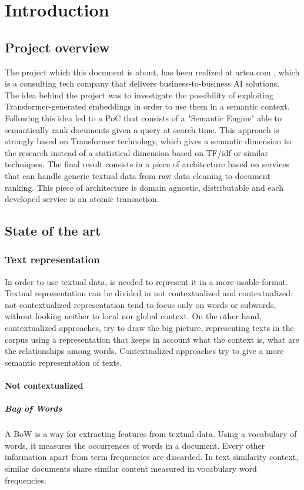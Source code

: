 \documentclass[\main/main.tex]{subfiles}
\begin{document}
\chapter{Introduction}
\section{Project overview}
The project which this document is about, has been realized at artea.com \cite{artea}, which is a consulting tech company that delivers business-to-business AI solutions. \\
The idea behind the project was to investigate the possibility of exploiting Transformer-generated embeddings in order to use them in a semantic context. Following this idea led to a PoC that consists of a "Semantic Engine" able to semantically rank documents given a query at search time. This approach is strongly based on Transformer technology, which gives a semantic dimension to the research instead of a statistical dimension based on TF/idf or similar techniques.
The final result consists in a piece of architecture based on services that can handle generic textual data from raw data cleaning to document ranking. This piece of architecture is domain agnostic, distributable and each developed service is an atomic transaction.
\section{State of the art}
\subsection{Text representation}
In order to use textual data, is needed to represent it in a more usable format. Textual representation can be divided in not contextualized and contextualized: not contextualized representation tend to focus only on words or subwords, without looking neither to local nor global context. On the other hand, contextualized approaches, try to draw the big picture, representing texts in the corpus using a representation that keeps in account what the context is, what are the relationships among words. Contextualized approaches try to give a more semantic representation of texts.
\subsubsection{Not contextualized}
\paragraph{Bag of Words}
A BoW is a way for extracting features from textual data. Using a vocabulary of words, it measures the occurrences of words in a document. Every other information apart from term frequencies are discarded. In text similarity context, similar documents share similar content measured in vocabulary word frequencies.
\end{document}
